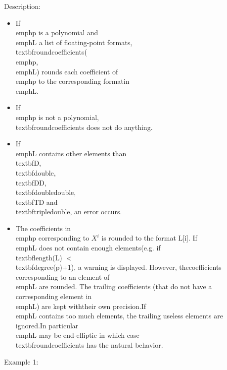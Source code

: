 \noindent Description: \begin{itemize}

\item If \\emph{p} is a polynomial and \\emph{L} a list of floating-point formats, \n   \\textbf{roundcoefficients}(\\emph{p},\\emph{L}) rounds each coefficient of \\emph{p} to the corresponding format\n   in \\emph{L}.\n
\item If \\emph{p} is not a polynomial, \\textbf{roundcoefficients} does not do anything.\n
\item If \\emph{L} contains other elements than \\textbf{D}, \\textbf{double}, \\textbf{DD}, \\textbf{doubledouble}, \\textbf{TD} and\n   \\textbf{tripledouble}, an error occurs.\n
\item The coefficients in \\emph{p} corresponding to $X^i$ is rounded to the \n   format L[i]. If \\emph{L} does not contain enough elements\n   (e.g. if \\textbf{length}(L) $<$ \\textbf{degree}(p)+1), a warning is displayed. However, the\n   coefficients corresponding to an element of \\emph{L} are rounded. The trailing \n   coefficients (that do not have a corresponding element in \\emph{L}) are kept with\n   their own precision.\n   If \\emph{L} contains too much elements, the trailing useless elements are ignored.\n   In particular \\emph{L} may be end-elliptic in which case \\textbf{roundcoefficients} has the \n   natural behavior.\n\end{itemize}
\noindent Example 1: 
\begin{center}\begin{minipage}{15cm}\begin{Verbatim}[frame=single]
\end{Verbatim}
\end{minipage}\end{center}
